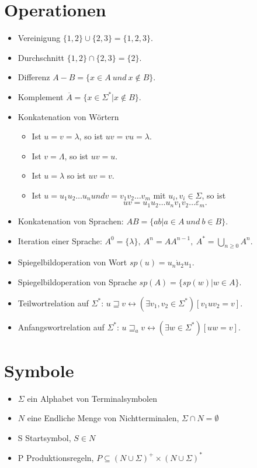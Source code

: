 \documentclass[9pt]{article}
\begin{document}
\section{Operationen}
\begin{itemize}
	\item Vereinigung $\{1, 2\} \cup \{2, 3\} = \{1, 2, 3\}$.
	\item Durchschnitt $\{1, 2\} \cap \{2, 3\} = \{2\}$.
	\item Differenz $A - B = \{x \in A\ und\ x \notin B\}$.
	\item Komplement $\overline{A} = \{x \in \Sigma^*|x\notin B\}$.
	\item Konkatenation von Wörtern
	\begin{itemize}
		\item Ist $u = v = \lambda$, so ist $uv = vu = \lambda$.
		\item Ist $v = \Lambda$, so ist $uv = u$.
		\item Ist $u = \lambda$ so ist $uv = v$.
		\item Ist $u = u_1 u_2 \dots u_n und v = v_1 v_2 \dots v_m $ mit $u_i , v_i \in \Sigma$, so ist
		$$uv = u_1 u_2 \dots u_n v_1 v_2 \dots \varepsilon_m.$$
	\end{itemize}
	\item Konkatenation von Sprachen:
	$AB = \{ab|a\in A \ und\ b \in B\}.$
	\item Iteration einer Sprache:
	$A^0 = \{\lambda\},\ A^n = AA^{n-1},\ A^* = \bigcup_{n\geq 0}A^n$.
	\item Spiegelbildoperation von Wort $sp(u)=u_n \dot u_2 u_1$.
	\item Spiegelbildoperation von Sprache $sp(A)=\{sp(w)|w \in A\}$.
	\item Teilwortrelation auf $\Sigma^*$: 
	 $u \sqsupseteq v \leftrightarrow (\exists v_1, v_2 \in \Sigma^*)[v_1 u v_2 = v]$.
	 \item Anfangswortrelation auf $\Sigma^*$:
	 $ u \sqsupseteq_a v \leftrightarrow (\exists w \in \Sigma^*)[uw = v]$.
\end{itemize}
\section{Symbole}
\begin{itemize}
	\item $\Sigma$ ein Alphabet von Terminalsymbolen
	\item $N$ eine Endliche Menge von Nichtterminalen, $\Sigma \cap N = \emptyset$
	\item S Startsymbol, $S \in N$
	\item P Produktionsregeln, $P \subseteq (N \cup \Sigma)^+ \times (N \cup \Sigma)^*$
\end{itemize}
\end{document}
